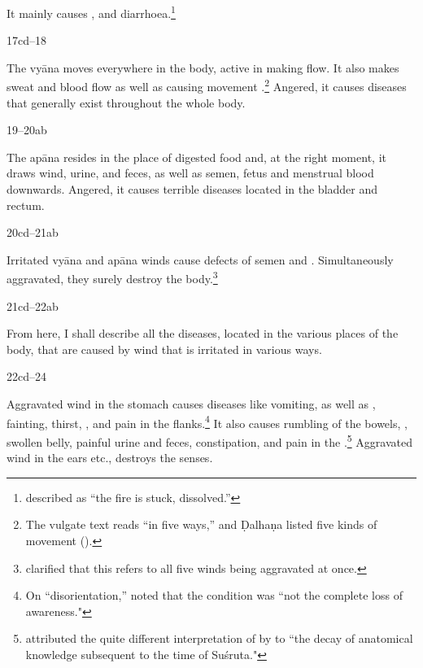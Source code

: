 \begin{translation}
	It mainly causes ,
	 and
	diarrhoea.\footnote{ described  as
	“the fire is stuck, dissolved.”}



\item[17cd--18] 

	The vyāna moves everywhere in the body, active in making
	 flow.   It also makes sweat and blood flow as well as
	causing movement .\footnote{The vulgate text
	reads  “in five ways,” and Ḍalhaṇa listed five kinds of
	 movement ().} Angered, it  causes diseases that
	generally exist throughout the whole body.
    

    
    \item [19--20ab]
    
	The apāna resides in the place of digested food and, at the right
	moment, it draws  wind, urine, and feces, as well as semen, fetus and
	 menstrual blood downwards.  Angered, it causes terrible diseases
	 located in the bladder and rectum.

\item[20cd--21ab]

	Irritated  vyāna and apāna winds cause defects of semen and
	.  Simultaneously aggravated, they surely
	destroy the body.\footnote{ clarified that this
	refers to all five winds being aggravated at once.}


	\bigskip

\item[21cd--22ab] 

	From here, I shall describe all the diseases, located in the various
	places of the body, that are caused by wind that is irritated in various
	ways.

\item[22cd--24] 

	Aggravated wind in the stomach causes diseases like vomiting, as well
as , fainting, thirst,
, and pain in the flanks.\footnote{On
    “disorientation,”  noted that the condition
    was  “not the complete loss of
    awareness."} It also causes rumbling of the bowels,
    , swollen belly, painful urine and feces,
    constipation, and pain in the
    .\footnote{\citet[140]{hoer-1907} attributed the
        quite different interpretation of  by
         to “the  decay of anatomical knowledge
        subsequent to the time of Suśruta."}
	Aggravated wind in the ears etc., destroys the senses.




\end{translation}
